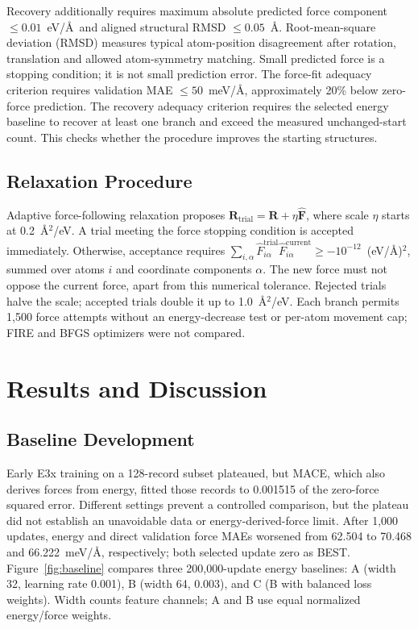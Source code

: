 \documentclass{article}
\begin{document}
Recovery additionally requires maximum absolute predicted force component $\leq0.01$~eV/\AA\ and aligned structural RMSD $\leq0.05$~\AA. Root-mean-square deviation (RMSD) measures typical atom-position disagreement after rotation, translation and allowed atom-symmetry matching. Small predicted force is a stopping condition; it is not small prediction error. The force-fit adequacy criterion requires validation MAE $\leq50$~meV/\AA, approximately 20\% below zero-force prediction. The recovery adequacy criterion requires the selected energy baseline to recover at least one branch and exceed the measured unchanged-start count. This checks whether the procedure improves the starting structures.

\subsection{Relaxation Procedure}
Adaptive force-following relaxation proposes $\mathbf R_{\mathrm{trial}}=\mathbf R+\eta\widehat{\mathbf F}$, where scale $\eta$ starts at 0.2~\AA$^2$/eV. A trial meeting the force stopping condition is accepted immediately. Otherwise, acceptance requires $\sum_{i,\alpha}\widehat F^{\mathrm{trial}}_{i\alpha}\widehat F^{\mathrm{current}}_{i\alpha}\geq-10^{-12}$~(eV/\AA)$^2$, summed over atoms $i$ and coordinate components $\alpha$. The new force must not oppose the current force, apart from this numerical tolerance. Rejected trials halve the scale; accepted trials double it up to 1.0~\AA$^2$/eV. Each branch permits 1,500 force attempts without an energy-decrease test or per-atom movement cap; FIRE and BFGS optimizers were not compared.

\section{Results and Discussion}
\subsection{Baseline Development}
Early E3x training on a 128-record subset plateaued, but MACE, which also derives forces from energy, fitted those records to 0.001515 of the zero-force squared error. Different settings prevent a controlled comparison, but the plateau did not establish an unavoidable data or energy-derived-force limit. After 1,000 updates, energy and direct validation force MAEs worsened from 62.504 to 70.468 and 66.222~meV/\AA, respectively; both selected update zero as BEST. Figure~\ref{fig:baseline} compares three 200,000-update energy baselines: A (width 32, learning rate 0.001), B (width 64, 0.003), and C (B with balanced loss weights). Width counts feature channels; A and B use equal normalized energy/force weights.
\end{document}
